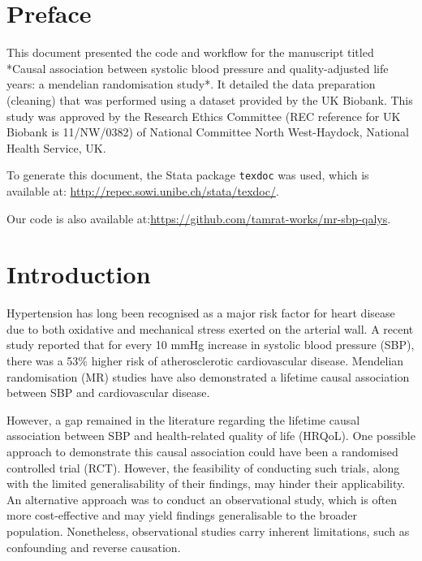 \documentclass[11pt]{article}
\begin{document}
\section{Preface}
This document presented the code and workflow for the manuscript titled *Causal association between systolic blood pressure and quality-adjusted life years: a mendelian randomisation study*. It detailed the data preparation (cleaning) that was performed using a dataset provided by the UK Biobank. This study was approved by the Research Ethics Committee (REC reference for UK Biobank is 11/NW/0382) of National Committee North West-Haydock, National Health Service, UK.

To generate this document, the Stata package \texttt{texdoc} was used, which is available at: \color{blue} \url{http://repec.sowi.unibe.ch/stata/texdoc/}.
\color{black}

Our code is also available at:\color{blue}\url{https://github.com/tamrat-works/mr-sbp-qalys}. 
\color{black} 

\color{black}  
\newpage
\section{Introduction}


Hypertension has long been recognised as a major risk factor for heart disease due to both oxidative and mechanical stress exerted on the arterial wall\cite{brown2020risk}. A recent study reported that for every 10 mmHg increase in systolic blood pressure (SBP), there was a 53\% higher risk of atherosclerotic cardiovascular disease\cite{whelton2020association}. Mendelian randomisation (MR) studies have also demonstrated a lifetime causal association between SBP and cardiovascular disease\cite{ference2019association, wan2021blood}.

However, a gap remained in the literature regarding the lifetime causal association between SBP and health-related quality of life (HRQoL). One possible approach to demonstrate this causal association could have been a randomised controlled trial (RCT). However, the feasibility of conducting such trials, along with the limited generalisability of their findings, may hinder their applicability. An alternative approach was to conduct an observational study, which is often more cost-effective and may yield findings generalisable to the broader population. Nonetheless, observational studies carry inherent limitations, such as confounding and reverse causation\cite{lawlor2008mendelian}.
\end{document}
